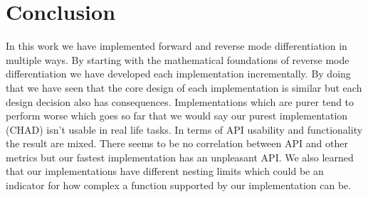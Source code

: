 \chapter{Conclusion}
In this work we have implemented forward and reverse mode differentiation in multiple ways. By starting with the mathematical foundations of reverse mode differentiation we have developed each implementation incrementally. By doing that we have seen that the core design of each implementation is similar but each design decision also has consequences. Implementations which are purer tend to perform worse which goes so far that we would say our purest implementation (CHAD) isn't usable in real life tasks. In terms of API usability and functionality the result are mixed. There seems to be no correlation between API and other metrics but our fastest implementation has an unpleasant API. We also learned that our implementations have different nesting limits which could be an indicator for how complex a function supported by our implementation can be.